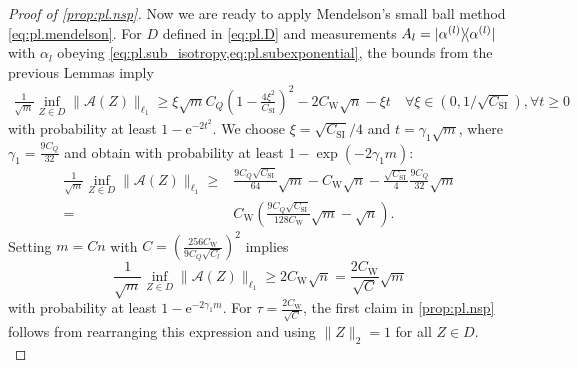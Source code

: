 \begin{proof}[Proof of \cref{prop:pl.nsp}]
  Now we are ready to apply Mendelson's small ball method \eqref{eq:pl.mendelson}.
  For $D$ defined in \eqref{eq:pl.D} and measurements $ A_l = \ketbra{\alpha\ind{l}}$ with $\alpha_l$ obeying \cref{eq:pl.sub_isotropy,eq:pl.subexponential}, the bounds from the previous Lemmas imply
  \begin{align}
    \frac{1}{\sqrt{m}}\inf_{ Z \in D} \|\mathcal{A}( Z) \|_{\ell_1} \geq \xi \sqrt{m} C_Q \left( 1- \frac{4 \xi^2}{C_\mathrm{SI}} \right)^2 - 2 C_\mathrm{W} \sqrt{n} - \xi t \quad \forall \xi \in (0, 1/\sqrt{C_\mathrm{SI}}), \forall t \geq 0
  \end{align}
  with probability at least $1- \mathrm{e}^{-2t^2}$. We choose $\xi = \sqrt{C_\mathrm{SI}}/4$ and $t = \gamma_1 \sqrt{m}$, where $\gamma_1 = \frac{9 C_Q}{32}$ and obtain with probability at least $1-\exp \left( -2 \gamma_1 m \right)$:
  \begin{align}
    \frac{1}{\sqrt{m}}\inf_{ Z \in D} \|\mathcal{A}( Z) \|_{\ell_1} \geq & \frac{9 C_Q\sqrt{C_\mathrm{SI}}}{64} \sqrt{m} -  C_\mathrm{W}\sqrt{n} - \frac{\sqrt{C_\mathrm{SI}}}{4} \frac{9 C_Q}{32} \sqrt{m} \\
    = & C_\mathrm{W} \left( \frac{9 C_Q \sqrt{C_\mathrm{SI}}}{128 C_\mathrm{W}} \sqrt{m} - \sqrt{n} \right).
  \end{align}
  Setting $m = C n$ with $C = \left( \frac{256 C_\mathrm{W}}{9 C_Q \sqrt{C_l}} \right)^2$ implies
  \[
    \frac{1}{\sqrt{m}} \inf_{ Z \in D} \| \mathcal{A}( Z) \|_{\ell_1} \geq 2 C_\mathrm{W} \sqrt{n} = \frac{2 C_\mathrm{W}}{\sqrt{C}} \sqrt{m}
  \]
  with probability at least $1- \mathrm{e}^{-2 \gamma_1 m}$.
  For $\tau = \frac{ 2 C_\mathrm{W}}{\sqrt{C}}$, the first claim in \cref{prop:pl.nsp} follows from rearranging this expression and using $\|  Z \|_2=1$ for all $ Z \in D$.\\



\end{proof}

